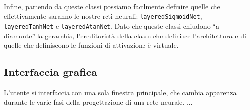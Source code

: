 \documentclass[12pt]{article}
\begin{document}
\paragraph{} Infine, partendo da queste classi possiamo facilmente definire quelle che effettivamente saranno le nostre reti neurali: \texttt{layeredSigmoidNet}, \texttt{layeredTanhNet} e \texttt{layeredAtanNet}. Dato che queste classi chiudono “a diamante” la gerarchia, l'ereditarietà della classe che definisce l'architettura e di quelle che definiscono le funzioni di attivazione è virtuale.

\subsection{Interfaccia grafica}

L'utente si interfaccia con una sola finestra principale, che cambia apparenza durante le varie fasi della progettazione di una rete neurale. ...
\end{document}
